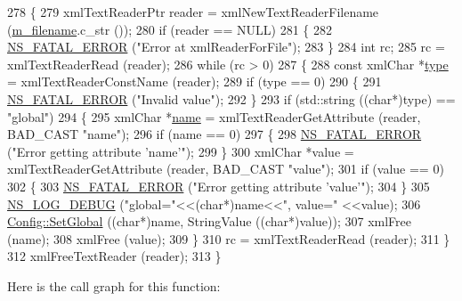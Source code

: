 \begin{DoxyCode}
278 \{
279   xmlTextReaderPtr reader = xmlNewTextReaderFilename (\hyperlink{classns3_1_1XmlConfigLoad_a8214344f421f9916919684829b0a129a}{m\_filename}.c\_str ());
280   \textcolor{keywordflow}{if} (reader == NULL)
281     \{
282       \hyperlink{group__fatal_ga5131d5e3f75d7d4cbfd706ac456fdc85}{NS\_FATAL\_ERROR} (\textcolor{stringliteral}{"Error at xmlReaderForFile"});
283     \}
284   \textcolor{keywordtype}{int} rc;
285   rc = xmlTextReaderRead (reader);
286   \textcolor{keywordflow}{while} (rc > 0)
287     \{
288       \textcolor{keyword}{const} xmlChar *\hyperlink{visualizer-ideas_8txt_add98db9e15e2a58cf2b57623e7aa893a}{type} = xmlTextReaderConstName (reader);
289       \textcolor{keywordflow}{if} (type == 0)
290         \{
291           \hyperlink{group__fatal_ga5131d5e3f75d7d4cbfd706ac456fdc85}{NS\_FATAL\_ERROR} (\textcolor{stringliteral}{"Invalid value"});
292         \}
293       \textcolor{keywordflow}{if} (std::string ((\textcolor{keywordtype}{char}*)type) == \textcolor{stringliteral}{"global"})
294         \{
295           xmlChar *\hyperlink{generate__test__data__lte__spectrum__model_8m_ab74e6bf80237ddc4109968cedc58c151}{name} = xmlTextReaderGetAttribute (reader, BAD\_CAST \textcolor{stringliteral}{"name"});
296           \textcolor{keywordflow}{if} (name == 0)
297             \{
298               \hyperlink{group__fatal_ga5131d5e3f75d7d4cbfd706ac456fdc85}{NS\_FATAL\_ERROR} (\textcolor{stringliteral}{"Error getting attribute 'name'"});
299             \}
300           xmlChar *value = xmlTextReaderGetAttribute (reader, BAD\_CAST \textcolor{stringliteral}{"value"});
301           \textcolor{keywordflow}{if} (value == 0)
302             \{
303               \hyperlink{group__fatal_ga5131d5e3f75d7d4cbfd706ac456fdc85}{NS\_FATAL\_ERROR} (\textcolor{stringliteral}{"Error getting attribute 'value'"});
304             \}
305           \hyperlink{group__logging_ga413f1886406d49f59a6a0a89b77b4d0a}{NS\_LOG\_DEBUG} (\textcolor{stringliteral}{"global="}<<(\textcolor{keywordtype}{char}*)name<<\textcolor{stringliteral}{", value="} <<value);
306           \hyperlink{group__config_ga0e12663a7bd119b65d0a219a578f2a3c}{Config::SetGlobal} ((\textcolor{keywordtype}{char}*)name, StringValue ((\textcolor{keywordtype}{char}*)value));
307           xmlFree (name);
308           xmlFree (value);
309         \}
310       rc = xmlTextReaderRead (reader);
311     \}
312   xmlFreeTextReader (reader);
313 \}
\end{DoxyCode}


Here is the call graph for this function\+:


